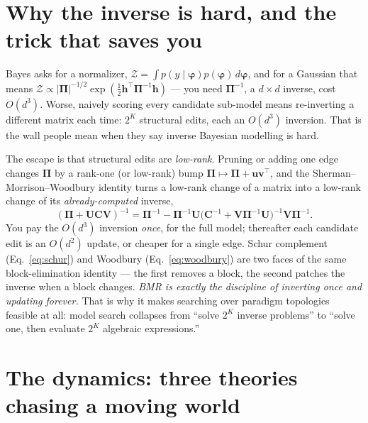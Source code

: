 \documentclass[11pt]{article}
\newcommand{\Prec}{\bm{\Pi}}        %
\newcommand{\hvec}{\bm{h}}          %
\newcommand{\fvec}{\bm{\varphi}}    %
\newcommand{\Z}{\mathcal{Z}}        %
\theoremstyle{definition}
\begin{document}
\section{Why the inverse is hard, and the trick that saves you}
\label{sec:compute}

Bayes asks for a normalizer, $\Z=\int p(y\mid\fvec)p(\fvec)\,d\fvec$, and
for a Gaussian that means $\Z\propto|\Prec|^{-1/2}\exp(\tfrac12
\hvec^{\top}\Prec^{-1}\hvec)$ --- you need $\Prec^{-1}$, a $d\times d$
inverse, cost $O(d^3)$. Worse, naively scoring every candidate sub-model
means re-inverting a different matrix each time: $2^K$ structural edits,
each an $O(d^3)$ inversion. That is the wall people mean when they say
inverse Bayesian modelling is hard.

The escape is that structural edits are \emph{low-rank}. Pruning or adding
one edge changes $\Prec$ by a rank-one (or low-rank) bump
$\Prec\mapsto\Prec+\bm u\bm v^{\top}$, and the
Sherman--Morrison--Woodbury identity turns a low-rank change of a matrix
into a low-rank change of its \emph{already-computed} inverse,
\begin{equation}
(\Prec+\bm U\bm C\bm V)^{-1}
=\Prec^{-1}-\Prec^{-1}\bm U\big(\bm C^{-1}+\bm V\Prec^{-1}\bm U\big)^{-1}\bm V\Prec^{-1}.
\label{eq:woodbury}
\end{equation}
You pay the $O(d^3)$ inversion \emph{once}, for the full model; thereafter
each candidate edit is an $O(d^2)$ update, or cheaper for a single edge.
Schur complement (Eq.~\ref{eq:schur}) and Woodbury (Eq.~\ref{eq:woodbury})
are two faces of the same block-elimination identity --- the first removes
a block, the second patches the inverse when a block changes. \emph{BMR is
exactly the discipline of inverting once and updating forever.} That is
why it makes searching over paradigm topologies feasible at all: model
search collapses from ``solve $2^K$ inverse problems'' to ``solve one,
then evaluate $2^K$ algebraic expressions.''

\section{The dynamics: three theories chasing a moving world}
\label{sec:dynamics}
\end{document}
